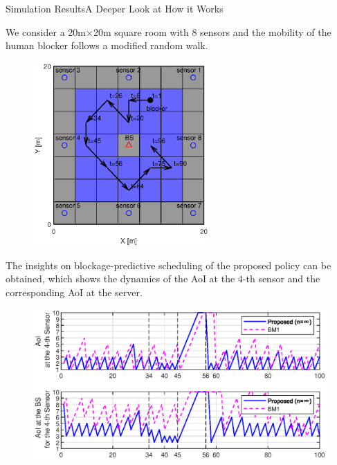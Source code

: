 \documentclass[aspectratio=169]{beamer}
\begin{document}
\begin{frame}{Simulation Results}{A Deeper Look at How it Works}
    \begin{minipage}[t]{0.45\linewidth}
        We consider a 20m$\times$20m square room with $8$ sensors and the mobility of the human blocker follows a modified random walk.
        \begin{figure}
            \centering
            \includegraphics[width=0.6\textwidth]{fig/layout.eps}
        \end{figure}
    \end{minipage}
    \hspace{0.01\linewidth}
    \begin{minipage}[t]{0.45\linewidth}
        The insights on blockage-predictive scheduling of the proposed policy can be obtained, which shows the dynamics of the AoI at the $4$-th sensor and the corresponding AoI at the server.
        \begin{figure}[htb]
            \centering
            \includegraphics[width=0.85\linewidth]{fig/insight.eps}
        \end{figure}
    \end{minipage}
\end{frame}
\end{document}

